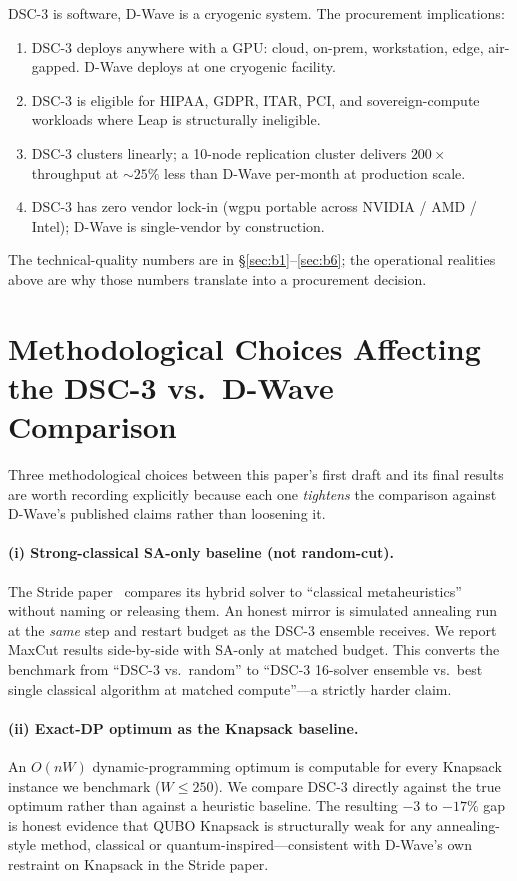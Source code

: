 \documentclass[11pt,a4paper]{article}
\begin{document}
DSC-3 is software, D-Wave is a cryogenic system. The procurement
implications:
\begin{enumerate}\itemsep0.1em
\item DSC-3 deploys anywhere with a GPU: cloud, on-prem, workstation,
  edge, air-gapped. D-Wave deploys at one cryogenic facility.
\item DSC-3 is eligible for HIPAA, GDPR, ITAR, PCI, and
  sovereign-compute workloads where Leap is structurally ineligible.
\item DSC-3 clusters linearly; a 10-node replication cluster
  delivers $200\times$ throughput at $\sim 25\%$ less than D-Wave
  per-month at production scale.
\item DSC-3 has zero vendor lock-in (wgpu portable across NVIDIA /
  AMD / Intel); D-Wave is single-vendor by construction.
\end{enumerate}
The technical-quality numbers are in
§\ref{sec:b1}--\ref{sec:b6}; the operational realities above are why
those numbers translate into a procurement decision.

\section{Methodological Choices Affecting the DSC-3 vs.\ D-Wave Comparison}
\label{sec:engineering}

Three methodological choices between this paper's first draft and its
final results are worth recording explicitly because each one
\emph{tightens} the comparison against D-Wave's published claims rather
than loosening it.

\paragraph{(i) Strong-classical SA-only baseline (not random-cut).}
The Stride paper~\cite{booth_stride_2024} compares its hybrid solver
to ``classical metaheuristics'' without naming or releasing them. An
honest mirror is simulated annealing run at the \emph{same} step and
restart budget as the DSC-3 ensemble receives. We report MaxCut
results side-by-side with SA-only at matched budget. This converts
the benchmark from ``DSC-3 vs.\ random'' to ``DSC-3 16-solver
ensemble vs.\ best single classical algorithm at matched compute''---a
strictly harder claim.

\paragraph{(ii) Exact-DP optimum as the Knapsack baseline.}
An $O(nW)$ dynamic-programming optimum is computable for every
Knapsack instance we benchmark ($W \le 250$). We compare DSC-3 directly
against the true optimum rather than against a heuristic baseline. The
resulting $-3$ to $-17\%$ gap is honest evidence that QUBO Knapsack is
structurally weak for any annealing-style method, classical or
quantum-inspired---consistent with D-Wave's own restraint on Knapsack
in the Stride paper.
\end{document}
